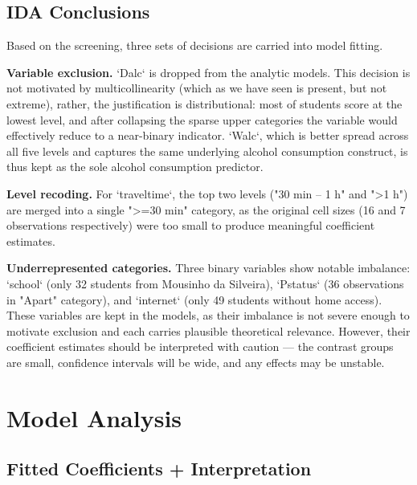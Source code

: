 \documentclass{article}
\begin{document}
\subsection{IDA Conclusions}

Based on the screening, three sets of decisions are carried into model fitting.

\vspace{0.2em}
\textbf{Variable exclusion.} `Dalc` is dropped from the analytic models. This decision is not motivated by multicollinearity (which as we have seen is present, but not extreme), rather, the justification is distributional: most of students score at the lowest level, and after collapsing the sparse upper categories the variable would effectively reduce to a near-binary indicator. `Walc`, which is better spread across all five levels and captures the same underlying alcohol consumption construct, is thus kept as the sole alcohol consumption predictor.

\vspace{0.2em}
\textbf{Level recoding.} For `traveltime`, the top two levels ("30 min -- 1 h" and "\textgreater1 h") are merged into a single "\textgreater=30 min" category, as the original cell sizes (16 and 7 observations respectively) were too small to produce meaningful coefficient estimates.

\vspace{0.2em}
\textbf{Underrepresented categories.} Three binary variables show notable imbalance: `school` (only 32 students from Mousinho da Silveira), `Pstatus` (36 observations in "Apart" category), and `internet` (only 49 students without home access). These variables are kept in the models, as their imbalance is not severe enough to motivate exclusion and each carries plausible theoretical relevance. However, their coefficient estimates should be interpreted with caution --- the contrast groups are small, confidence intervals will be wide, and any effects may be unstable.




\section{Model Analysis}


\subsection{Fitted Coefficients + Interpretation}
\end{document}
